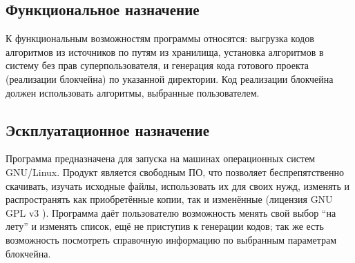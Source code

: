 \subsection{Функциональное назначение}
К функциональным возможностям программы относятся:
выгрузка кодов алгоритмов из источников по путям из хранилища, установка
алгоритмов в систему без прав суперпользователя, и генерация кода готового
проекта (реализации блокчейна) по указанной директории. Код реализации
блокчейна должен использовать алгоритмы, выбранные пользователем.

\subsection{Эскплуатационное назначение}
Программа предназначена для запуска на машинах операционных систем GNU/Linux.
Продукт является свободным ПО, что позволяет беспрепятственно скачивать,
изучать исходные файлы, использовать их для своих нужд, изменять и
распространять как приобретённые копии, так и изменённые (лицензия GNU GPL v3
\cite{gnu}).
Программа даёт пользователю возможность менять свой выбор ``на лету'' и
изменять список, ещё не приступив к генерации кодов; так же есть возможность
посмотреть справочную информацию по выбранным параметрам блокчейна.


